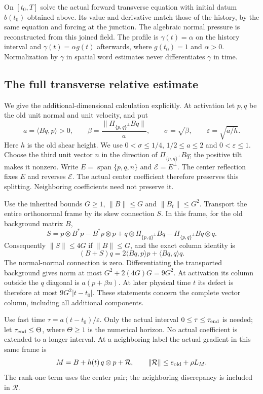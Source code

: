 On $[t_0,T]$ solve the actual forward transverse equation with initial
datum $b(t_0)$ obtained above. Its value and derivative match those of
the history, by the same equation and forcing at the junction.
The algebraic normal pressure is reconstructed from this joined field.
The profile is $\gamma(t)=\alpha$ on the history interval and
$\gamma(t)=\alpha g(t)$ afterwards, where $g(t_0)=1$ and $\alpha>0$.
Normalization by $\gamma$ in spatial word estimates never differentiates
$\gamma$ in time.

\subsection{The full transverse relative estimate}
\label{subsec:full-transverse-relative}

We give the additional-dimensional calculation explicitly. At activation
let $p,q$ be the old unit normal and unit velocity, and put
\[
 a=\langle Bq,p\rangle>0,\qquad
 \beta=\frac{\|\Pi_{\{p,q\}^{\perp}}Bq\|}{a},\qquad
 \sigma=\sqrt\beta,\qquad \varepsilon=\sqrt{a/h}.
\]
Here $h$ is the old shear height. We use $0<\sigma\leq1/4$,
$1/2\leq a\leq2$ and $0<\varepsilon\leq1$.
Choose the third unit vector $n$ in the direction of
$\Pi_{\{p,q\}^{\perp}}Bq$; the positive tilt makes it nonzero.
Write $E=\operatorname{span}\{p,q,n\}$ and
$\mathcal E=E^\perp$. The center reflection fixes $E$ and reverses
$\mathcal E$. The actual center coefficient therefore preserves this
splitting. Neighboring coefficients need not preserve it.

Use the inherited bounds $G\geq1$, $\|B\|\leq G$ and
$\|B_t\|\leq G^2$. Transport the entire orthonormal frame by its skew
connection $S$. In this frame, for the old background matrix $B$,
\[
 S=p\otimes B^*p-B^*p\otimes p+
       q\otimes\Pi_{\{p,q\}^{\perp}}Bq
       -\Pi_{\{p,q\}^{\perp}}Bq\otimes q .
\]
Consequently $\|S\|\leq4G$ if $\|B\|\leq G$, and the exact column identity is
\begin{equation}\label{eq:full-connection-column}
 (B+S)q=2\langle Bq,p\rangle p+\langle Bq,q\rangle q.
\end{equation}
The normal-normal connection is zero. Differentiating the transported
background gives norm at most $G^2+2(4G)G=9G^2$.
At activation its column outside the $q$ diagonal is
$a(p+\beta n)$. At later physical time $t$ its defect is therefore at
most $9G^2|t-t_0|$. These statements concern the complete vector column,
including all additional components.

Use fast time $\tau=a(t-t_0)/\varepsilon$. Only the actual interval
$0\leq\tau\leq\tau_{\rm end}$ is needed; let
$\tau_{\rm end}\leq\Theta$, where $\Theta\geq1$ is the numerical horizon.
No actual coefficient is extended to a longer interval.
At a neighboring label the actual gradient in this same frame is
\[
 M=B+h(t)\,q\otimes p+\mathcal R,\qquad
 \|\mathcal R\|\leq e_{\rm old}+\rho L_M .
\]
The rank-one term uses the center pair; the neighboring discrepancy is
included in $\mathcal R$.

